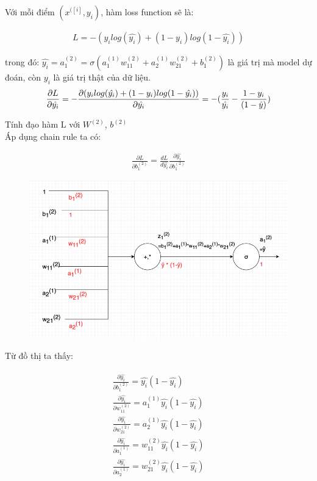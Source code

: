 Với mỗi điểm $(x^{([i]}, y_i)$, hàm loss function sẽ là:

\begin{align}
L = -(y_i  log(\hat{y_i}) + (1 - y_i)  log(1 - \hat{y_i}))
\end{align}


trong đó: $\hat{y_i} = a_1^{(2)} = \sigma(a_1^{(1)}  w_{11}^{(2)} + a_2^{(1)}  w_{21}^{(2)} + b_1^{(2)})$
 là giá trị mà model dự đoán, còn $y_i$ là giá trị thật của dữ liệu.
\begin{align}
\frac{\partial L}{\partial\hat{y_i}} = - \frac{\partial(y_i  log(\hat{y_i}) + (1 - y_i)  log(1 - \hat{y_i}))}{\partial\hat{y_i}}= - (\frac{y_i}{\hat{y_i}} - \frac{1-y_i}{(1-\hat{y})})\newline
\end{align}

Tính đạo hàm L với $W^{(2)}$, $b^{(2)}$\\
Áp dụng chain rule ta có: 

\begin{align}
 \frac{\partial L}{\partial b_1^{(2)}} = \frac{dL}{d\hat{y_i}}  \frac{\partial\hat{y_i}}{\partial b_1^{(2)} }
\end{align}

\FloatBarrier
\begin{figure}[htp]
\begin{center}
\includegraphics[scale=1]{chap2/c2_figs/6.png}
\end{center}
\label{fig:feed_forward}
\end{figure}
\FloatBarrier

Từ đồ thị ta thấy:

\begin{align}
	\begin{split}
		\frac{\partial\hat{y_i}}{\partial b_1^{(2)}} = \hat{y_i}  (1-\hat{y_i}) \\
		\frac{\partial\hat{y_i}}{\partial w_{11}^{(2)}} = a_1^{(1)} \hat{y_i} (1-\hat{y_i}) \\
		\frac{\partial\hat{y_i}}{\partial w_{21}^{(2)}} = a_2^{(1)} \hat{y_i}  (1-\hat{y_i}) \\
		\frac{\partial\hat{y_i}}{\partial a_1^{(1)} }=w_{11} ^{(2)} \hat{y_i} (1-\hat{y_i}) \\
		\frac{\partial\hat{y_i}}{\partial a_2^{(1)} }=w_{21} ^{(2)} \hat{y_i} (1-\hat{y_i}) 
	\end{split}
\end{align}


